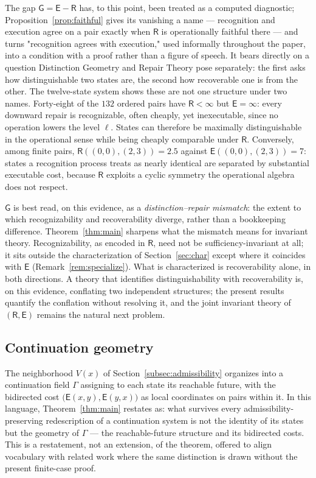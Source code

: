 \documentclass[11pt]{article}
\theoremstyle{remark}
\newcommand{\R}{\mathsf{R}}
\newcommand{\E}{\mathsf{E}}
\newcommand{\G}{\mathsf{G}}
\begin{document}
The gap $\G=\E-\R$ has, to this point, been treated as a computed
diagnostic; Proposition~\ref{prop:faithful} gives its vanishing a
name --- recognition and execution agree on a pair exactly when $\R$
is operationally faithful there --- and turns "recognition agrees
with execution," used informally throughout the paper, into a
condition with a proof rather than a figure of speech. It bears directly on a question
Distinction Geometry and Repair Theory pose separately: the first asks
how distinguishable two states are, the second how recoverable one is
from the other. The twelve-state system shows these are not one
structure under two names. Forty-eight of the $132$ ordered pairs have
$\R<\infty$ but $\E=\infty$: every downward repair is recognizable,
often cheaply, yet inexecutable, since no operation lowers the level
$\ell$. States can therefore be maximally distinguishable in the
operational sense while being cheaply comparable under $\R$.
Conversely, among finite pairs, $\R((0,0),(2,3))=2.5$ against
$\E((0,0),(2,3))=7$: states a recognition process treats as nearly
identical are separated by substantial executable cost, because $\R$
exploits a cyclic symmetry the operational algebra does not respect.

$\G$ is best read, on this evidence, as a \emph{distinction--repair
mismatch}: the extent to which recognizability and recoverability
diverge, rather than a bookkeeping difference. Theorem~\ref{thm:main}
sharpens what the mismatch means for invariant theory. Recognizability,
as encoded in $\R$, need not be sufficiency-invariant at all; it sits
outside the characterization of Section~\ref{sec:char} except where it
coincides with $\E$ (Remark~\ref{rem:specialize}). What is
characterized is recoverability alone, in both directions. A theory
that identifies distinguishability with recoverability is, on this
evidence, conflating two independent structures; the present results
quantify the conflation without resolving it, and the joint invariant
theory of $(\R,\E)$ remains the natural next problem.

\subsection{Continuation geometry}\label{subsec:continuation}

The neighborhood $V(x)$ of Section~\ref{subsec:admissibility}
organizes into a continuation field $\Gamma$ assigning to each state
its reachable future, with the bidirected cost
$\bigl(\E(x,y),\E(y,x)\bigr)$ as local coordinates on pairs within it.
In this language, Theorem~\ref{thm:main} restates as: what survives
every admissibility-preserving redescription of a continuation system
is not the identity of its states but the geometry of $\Gamma$ ---
the reachable-future structure and its bidirected costs. This is a
restatement, not an extension, of the theorem, offered to align
vocabulary with related work where the same distinction is drawn
without the present finite-case proof.
\end{document}
